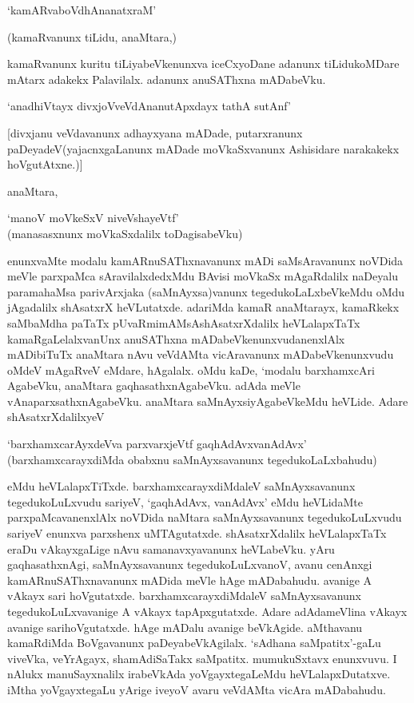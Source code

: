 \begin{shloka}
`kamARvaboVdhAnanatxraM'
\end{shloka}

(kamaRvanunx tiLidu, anaMtara,)

kamaRvanunx kuritu tiLiyabeVkenunxva iceCxyoDane adanunx tiLidukoMDare mAtarx adakekx Palavilalx. adanunx anuSAThxna mADabeVku.

\begin{shloka}
`anadhiVtayx divxjoVveVdAnanutApxdayx tathA sutAnf'
\end{shloka}

[divxjanu veVdavanunx adhayxyana mADade, putarxranunx paDeyadeV(yajacnxgaLanunx mADade moVkaSxvanunx Ashisidare narakakekx hoVgutAtxne.)]

anaMtara,

\begin{shloka}
`manoV moVkeSxV niveVshayeVtf'\\
(manasasxnunx moVkaSxdalilx toDagisabeVku)
\end{shloka}

\noindent enunxvaMte modalu kamARnuSAThxnavanunx mADi saMsAravanunx noVDida meVle parxpaMca sAravilalxdedxMdu BAvisi moVkaSx mAgaRdalilx naDeyalu paramahaMsa parivArxjaka (saMnAyxsa)vanunx tegedukoLaLxbeVkeMdu oMdu jAgadalilx shAsatxrX heVLutatxde. adariMda kamaR anaMtarayx, kamaRkekx saMbaMdha paTaTx pUvaRmimAMsAshAsatxrXdalilx heVLalapxTaTx kamaRgaLelalxvanUnx anuSAThxna mADabeVkenunxvudanenxlAlx mADibiTuTx anaMtara nAvu veVdAMta vicAravanunx mADabeVkenunxvudu oMdeV mAgaRveV eMdare, hAgalalx. oMdu kaDe, `modalu barxhamxcAri AgabeVku, anaMtara gaqhasathxnAgabeVku. adAda meVle vAnaparxsathxnAgabeVku. anaMtara saMnAyxsiyAgabeVkeMdu heVLide. Adare shAsatxrXdalilxyeV

\begin{shloka}
`barxhamxcarAyxdeVva parxvarxjeVtf gaqhAdAvxvanAdAvx'\\
(barxhamxcarayxdiMda obabxnu saMnAyxsavanunx tegedukoLaLxbahudu)
\end{shloka} 

eMdu heVLalapxTiTxde. barxhamxcarayxdiMdaleV saMnAyxsavanunx tegedukoLuLxvudu sariyeV, `gaqhAdAvx, vanAdAvx' eMdu heVLidaMte parxpaMcavanenxlAlx noVDida naMtara saMnAyxsavanunx tegedukoLuLxvudu sariyeV enunxva parxshenx uMTAgutatxde. shAsatxrXdalilx heVLalapxTaTx eraDu vAkayxgaLige nAvu samanavxyavanunx heVLabeVku. yAru gaqhasathxnAgi, saMnAyxsavanunx tegedukoLuLxvanoV, avanu cenAnxgi kamARnuSAThxnavanunx mADida meVle hAge mADabahudu. avanige A vAkayx sari hoVgutatxde. barxhamxcarayxdiMdaleV saMnAyxsavanunx tegedukoLuLxvavanige A vAkayx tapApxgutatxde. Adare adAdameVlina vAkayx avanige sarihoVgutatxde. hAge mADalu avanige beVkAgide. aMthavanu kamaRdiMda BoVgavanunx paDeyabeVkAgilalx. `sAdhana saMpatitx'-gaLu viveVka, veYrAgayx, shamAdiSaTakx saMpatitx. mumukuSxtavx enunxvuvu. I nAlukx manuSayxnalilx irabeVkAda yoVgayxtegaLeMdu heVLalapxDutatxve. iMtha yoVgayxtegaLu yArige iveyoV avaru veVdAMta vicAra mADabahudu.

